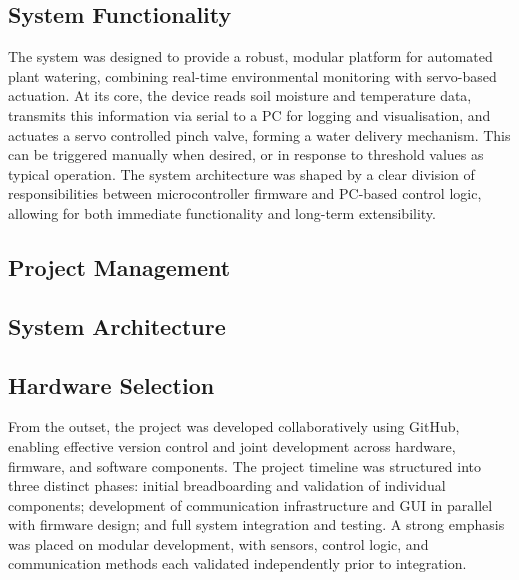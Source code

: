 \documentclass[a4paper,11pt]{article}
\begin{document}
\subsection{System Functionality}

The system was designed to provide a robust, 
modular platform for automated plant watering, 
combining real-time environmental monitoring with servo-based actuation. 
At its core, the device reads soil moisture and temperature data, 
transmits this information via serial 
to a PC for logging and visualisation, 
and actuates a servo controlled pinch valve,
forming a water delivery mechanism.
This can be triggered manually when desired,
or in response to threshold values as typical operation. 
The system architecture was shaped by a clear division of responsibilities 
between microcontroller firmware and PC-based control logic, 
allowing for both immediate functionality and long-term extensibility.

\subsection{Project Management}
\label{sec:PM}

\subsection{System Architecture}

\subsection{Hardware Selection}

From the outset, the project was developed collaboratively using GitHub, 
enabling effective version control and joint development across 
hardware, firmware, and software components. 
The project timeline was structured into three distinct phases: 
initial breadboarding and validation of individual components; 
development of communication infrastructure and 
GUI in parallel with firmware design; 
and full system integration and testing. 
A strong emphasis was placed on modular development, 
with sensors, control logic, and communication methods each validated 
independently prior to integration.
\end{document}
